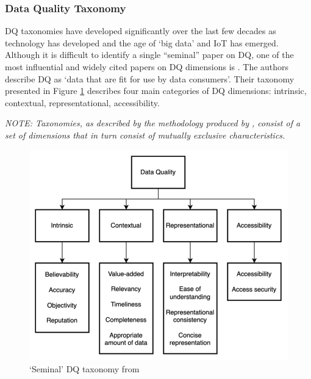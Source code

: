\subsubsection{Data Quality Taxonomy}

DQ taxonomies have developed significantly over the last few decades as technology has developed and the age of ‘big data’ and IoT has emerged. Although it is difficult to identify a single “seminal” paper on DQ, one of the most influential and widely cited papers on DQ dimensions is \cite{wangAccuracyWhatData1996}. The authors describe DQ as ‘data that are fit for use by data consumers’. Their taxonomy presented in Figure \ref{fig:seminal_dq_taxonomy} describes four main categories of DQ dimensions: intrinsic, contextual, representational, accessibility.

    {\color{secondary-text-color} \textit{NOTE: Taxonomies, as described by the methodology produced by \cite{nickersonMethodTaxonomyDevelopment2013}, consist of a set of dimensions that in turn consist of mutually exclusive characteristics.}}

\begin{figure}[h]
    \centering
    \includegraphics[]{figures/literature_review/seminal_dq_taxonomy.png}
    \caption{‘Seminal’ DQ taxonomy from \cite{wangAccuracyWhatData1996}}
    \label{fig:seminal_dq_taxonomy}
\end{figure}

